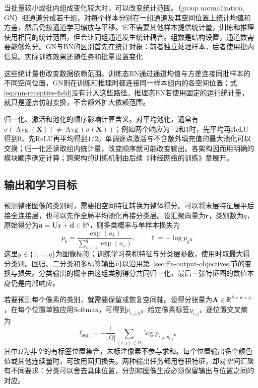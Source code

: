 当批量较小或批内组成变化较大时，可以改变统计范围。（group normalization, GN）把通道分成若干组，对每个样本分别在一组通道及其空间位置上统计均值和方差，然后仍按通道学习缩放与平移。它不需要其他样本提供统计量，训练和推理使用相同的统计范围，但会让同组通道发生统计耦合。组数是结构设置，通道数需要能够均分。GN与BN的区别首先在统计对象：前者独立处理样本，后者使用批内信息。实际训练效果还随任务和批量设置变化

这些统计量也改变数据依赖范围。训练态BN通过通道均值与方差连接同批样本的不同空间位置，GN则在训练和推理时都连接同一样本组内的各空间位置；式\eqref{eq:cnn-receptive-field}没有计入这些路径。推理态BN若使用固定的运行统计量，就只是逐点仿射变换，不会额外扩大依赖范围。

归一化、激活和池化的顺序影响计算含义。对平均池化，通常有$\sigma(\operatorname{Avg}(\bm X))\neq\operatorname{Avg}(\sigma(\bm X))$；例如两个响应为$-2$和$1$时，先平均再ReLU得到$0$，先ReLU再平均得到$1/2$。单调逐点激活与不含额外填充值的最大池化可以交换；归一化还读取组内统计量，改变顺序就可能改变输出。各架构因而用明确的模块顺序确定计算；跨架构的训练机制由后续《神经网络的训练》章展开。

\subsection{输出和学习目标}
\label{sec:cnn-output-objectives}

预测整张图像的类别时，需要把空间特征转换为整体得分。可以将末层特征展平后接全连接层，也可以先作全局平均池化再接分类层。设汇聚向量为$\bm r$，类别数为$q$，原始得分为$\bm a=\bm U\bm r+\bm d\in\mathbb R^q$，则多类概率与单样本损失为
\begin{equation}
  p_k=\frac{\exp(a_k)}{\sum_{v=1}^{q}\exp(a_v)},\qquad
  \ell=-\log p_y\text{。}
  \label{eq:cnn-image-classification}
\end{equation}
这里$y\in\{1,\ldots,q\}$为图像标签；训练学习卷积特征与分类层参数，使用时取最大得分类别。回归、二分类和多标签输出可以沿用第~\ref{sec:ffn-output-objectives}节的变换与损失。分类输出的概率由这组类别得分共同归一化，最后一张特征图的数值本身仍是内部响应。

若要预测每个像素的类别，就需要保留或恢复空间轴。设得分张量为$\bm A\in\mathbb R^{h\times w\times q}$，在每个位置单独应用Softmax，可得到$p_{i,j,k}$。给定像素标签$y_{i,j}$，逐位置交叉熵为
\begin{equation}
  \ell_{\mathrm{seg}}=-\frac1{|\Omega|}
    \sum_{(i,j)\in\Omega}\log p_{i,j,y_{i,j}}\text{。}
  \label{eq:cnn-segmentation-loss}
\end{equation}
其中$\Omega$为非空的有标签位置集合，未标注像素不参与求和。每个位置输出多个颜色值或其他连续量时，可改用回归损失。两种输出任务都用卷积特征，却对空间汇聚有不同要求：分类可以舍去具体位置，分割和图像生成必须保留输出与位置之间的对应。

